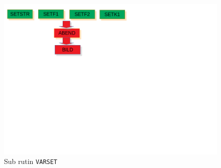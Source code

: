 \documentclass[a4paper,11pt]{report}
\begin{document}
\begin{figure}[h!]
  \begin{center}
    \includegraphics[scale=.5]{../varSET.png}
    \caption{Sub rutin \texttt{VARSET}}
    \label{fig:varset}
  \end{center}
\end{figure}




%	
%	
\end{document}
